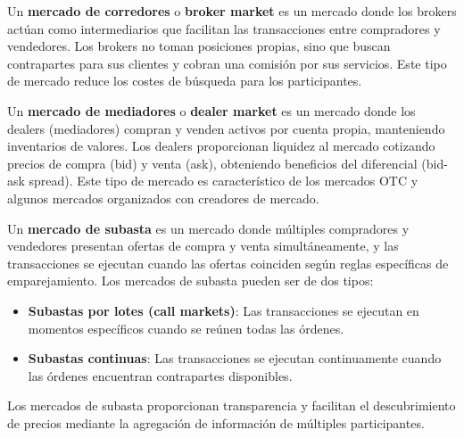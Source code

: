 \begin{definicion}
Un \textbf{mercado de corredores} o \textbf{broker market} es un mercado donde los brokers actúan como intermediarios que facilitan las transacciones entre compradores y vendedores. Los brokers no toman posiciones propias, sino que buscan contrapartes para sus clientes y cobran una comisión por sus servicios. Este tipo de mercado reduce los costes de búsqueda para los participantes.
\end{definicion}

\begin{definicion}
Un \textbf{mercado de mediadores} o \textbf{dealer market} es un mercado donde los dealers (mediadores) compran y venden activos por cuenta propia, manteniendo inventarios de valores. Los dealers proporcionan liquidez al mercado cotizando precios de compra (bid) y venta (ask), obteniendo beneficios del diferencial (bid-ask spread). Este tipo de mercado es característico de los mercados OTC y algunos mercados organizados con creadores de mercado.
\end{definicion}

\begin{definicion}
Un \textbf{mercado de subasta} es un mercado donde múltiples compradores y vendedores presentan ofertas de compra y venta simultáneamente, y las transacciones se ejecutan cuando las ofertas coinciden según reglas específicas de emparejamiento. Los mercados de subasta pueden ser de dos tipos:
\begin{itemize}
\item \textbf{Subastas por lotes (call markets)}: Las transacciones se ejecutan en momentos específicos cuando se reúnen todas las órdenes.
\item \textbf{Subastas continuas}: Las transacciones se ejecutan continuamente cuando las órdenes encuentran contrapartes disponibles.
\end{itemize}
Los mercados de subasta proporcionan transparencia y facilitan el descubrimiento de precios mediante la agregación de información de múltiples participantes.
\end{definicion}

